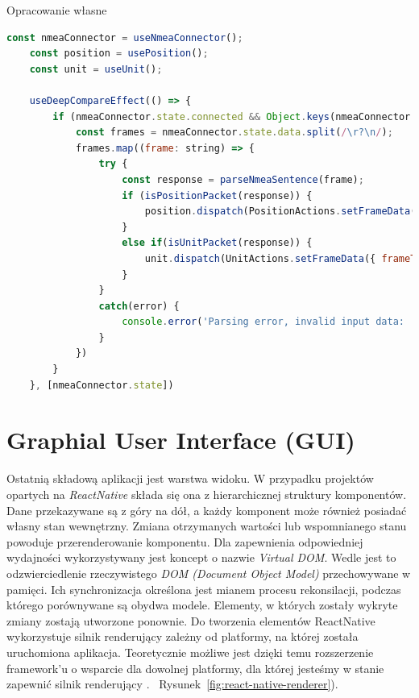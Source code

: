 \documentclass[skorowidz,skroty]{dyplomWEZUT}
\begin{document}
{Opracowanie własne}{\label{code: parse&dispatch}}
\begin{lstlisting}[language=JavaScript]
    const nmeaConnector = useNmeaConnector();
    const position = usePosition();
    const unit = useUnit();

    useDeepCompareEffect(() => {
        if (nmeaConnector.state.connected && Object.keys(nmeaConnector.state.data).length > 0) {
            const frames = nmeaConnector.state.data.split(/\r?\n/);
            frames.map((frame: string) => {
                try {
                    const response = parseNmeaSentence(frame);
                    if (isPositionPacket(response)) {
                        position.dispatch(PositionActions.setFrameData({ frameType: response.sentenceId, frameData: response }))
                    }
                    else if(isUnitPacket(response)) {
                        unit.dispatch(UnitActions.setFrameData({ frameType: response.sentenceId, frameData: response }))
                    }
                }
                catch(error) {
                    console.error('Parsing error, invalid input data: ', error)
                }
            })
        }
    }, [nmeaConnector.state])
\end{lstlisting}


\section{Graphial User Interface (GUI)}\label{sec: GUI}

	Ostatnią składową aplikacji jest warstwa widoku. W przypadku projektów opartych na \textit{ReactNative} składa się ona z hierarchicznej struktury komponentów. Dane przekazywane są z góry na dół, a każdy komponent może również posiadać własny stan wewnętrzny. Zmiana otrzymanych wartości lub wspomnianego stanu powoduje przerenderowanie komponentu. Dla zapewnienia odpowiedniej wydajności wykorzystywany jest koncept o nazwie \textit{Virtual DOM}. Wedle \cite{React} jest to odzwierciedlenie rzeczywistego \textit{DOM (Document Object Model)} przechowywane w pamięci. Ich synchronizacja określona jest mianem procesu rekonsilacji, podczas którego porównywane są obydwa modele. Elementy, w których zostały wykryte zmiany zostają utworzone ponownie. Do tworzenia elementów ReactNative wykorzystuje silnik renderujący zależny od platformy, na której została uruchomiona aplikacja. Teoretycznie możliwe jest dzięki temu rozszerzenie framework'u o wsparcie dla dowolnej platformy, dla której jesteśmy w stanie zapewnić silnik renderujący \cite{ReactNativeRenderers}. ~Rysunek~\ref{fig:react-native-renderer}).
	
\end{document}

